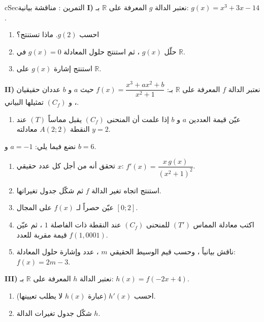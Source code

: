 \documentclass[12pt,a4paper]{article}
\newenvironment{BOX}[2]{\begin{otherlanguage}{english}\begin{arbox}{#1}{#2}}{\end{arbox}\end{otherlanguage}}
\newcounter{exo}
\newenvironment{tamrin}[1]{\stepcounter{exo}\begin{BOX}{cSec}{التمرين \theexo: #1}}{\end{BOX}}
\newcommand{\R}{\mathbb{R}}
\begin{document}
\begin{tamrin}{مناقشة بيانية}
\textbf{I)} نعتبر الدالة $g$ المعرفة على $\R$ بـ: $g(x)=x^3+3x-14$.
\begin{enumerate}
\item احسب $g(2)$. ماذا تستنتج؟
\item حلّل $g(x)$ ، ثم استنتج حلول المعادلة $g(x)=0$ في $\R$.
\item استنتج إشارة $g(x)$ على $\R$.
\end{enumerate}
\textbf{II)} نعتبر الدالة $f$ المعرفة على $\R$ بـ: $f(x)=\dfrac{x^3+ax^2+b}{x^2+1}$ حيث $a$ و $b$ عددان حقيقيان ، و $(C_f)$ تمثيلها البياني.
\begin{enumerate}
\item عيّن قيمة العددين $a$ و $b$ إذا علمت أن المنحنى $(C_f)$ يقبل مماساً $(T)$ عند النقطة $A(2;2)$ معادلته $y=2$.
\end{enumerate}
نضع فيما يلي: $a=-1$ و $b=6$.
\begin{enumerate}[resume]
\item تحقق أنه من أجل كل عدد حقيقي $x$: $f'(x)=\dfrac{x\,g(x)}{(x^2+1)^2}$.
\item استنتج اتجاه تغير الدالة $f$ ثم شكّل جدول تغيراتها.
\item عيّن حصراً لـ $f(x)$ على المجال $[0;2]$.
\item اكتب معادلة المماس $(T')$ للمنحنى $(C_f)$ عند النقطة ذات الفاصلة $1$ ، ثم عيّن قيمة مقربة للعدد $f(1{,}0001)$.
\item ناقش بيانياً ، وحسب قيم الوسيط الحقيقي $m$ ، عدد وإشارة حلول المعادلة: $f(x)=2m-3$.
\end{enumerate}
\textbf{III)} نعتبر الدالة $h$ المعرفة على $\R$ بـ: $h(x)=f(-2x+4)$.
\begin{enumerate}
\item احسب $h'(x)$ (عبارة $h(x)$ لا يطلب تعيينها).
\item شكّل جدول تغيرات الدالة $h$.
\end{enumerate}
\end{tamrin}
\end{document}
